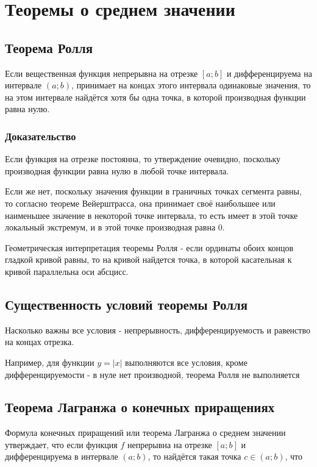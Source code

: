\section{Теоремы о среднем значении}

\subsection{Теорема Ролля}

Если вещественная функция непрерывна на отрезке $[a; b]$ и дифференцируема на интервале $(a; b)$, принимает на концах этого интервала одинаковые значения, то на этом интервале найдётся хотя бы одна точка, в которой производная функции равна нулю.

\subsubsection{Доказательство}

Если функция на отрезке постоянна, то утверждение очевидно, поскольку производная функции равна нулю в любой точке интервала.

Если же нет, поскольку значения функции в граничных точках сегмента равны, то согласно теореме Вейерштрасса, она принимает своё наибольшее или наименьшее значение в некоторой точке интервала, то есть имеет в этой точке локальный экстремум, и в этой точке производная равна 0.

Геометрическая интерпретация теоремы Ролля - если ординаты обоих концов гладкой кривой равны, то на кривой найдется точка, в которой касательная к кривой параллельна оси абсцисс.

\subsection{Существенность условий теоремы Ролля}

Насколько важны все условия - непрерывность, дифференцируемость и равенство на концах отрезка.

Например, для функции $ y = |x| $ выполняются все условия, кроме дифференцируемости - в нуле нет производной, теорема Ролля не выполняется

\subsection{Теорема Лагранжа о конечных приращениях}

Формула конечных приращений или теорема Лагранжа о среднем значении утверждает, что если функция $ f $ непрерывна на отрезке $[a; b]$ и дифференцируема в интервале $(a;b)$, то найдётся такая точка $ c\in (a;b)$, что

